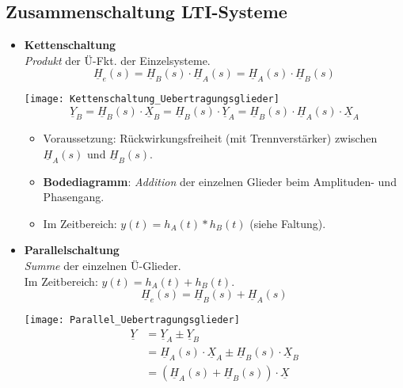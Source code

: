 \subsection{Zusammenschaltung LTI-Systeme}
\begin{itemize}
    \item \textbf{Kettenschaltung}\\
        \textit{Produkt} der Ü-Fkt. der Einzelsysteme.
        \[
            \boxed{\underline{H}_{e}(s)=\underline{H}_{B}(s) \cdot \underline{H}_{A}(s)=\underline{H}_{A}(s) \cdot \underline{H}_{B}(s)}
        \]
        \begin{center}
            \texttt{[image: Kettenschaltung\_Uebertragungsglieder]}
            \[
                \underline{Y}_{B}=\underline{H}_{B}(s) \cdot \underline{X}_{B}=\underline{H}_{B}(s) \cdot \underline{Y}_{A}=\underline{H}_{B}(s) \cdot \underline{H}_{A}(s) \cdot \underline{X}_{A}
            \]
        \end{center}
        \begin{itemize}
	        \item Voraussetzung: Rückwirkungsfreiheit (mit Trennverstärker) zwischen $\underline{H}_A(s)$ und $\underline{H}_B(s)$.
        	\item \textbf{Bodediagramm}: \textit{Addition} der einzelnen Glieder beim Amplituden- und Phasengang.
        	\item Im Zeitbereich: $y(t)=h_A(t) * h_B(t)$ (siehe Faltung).
        \end{itemize}      
    \item \textbf{Parallelschaltung}\\
        \textit{Summe} der einzelnen Ü-Glieder.\\
        Im Zeitbereich: $y(t)=h_A(t) + h_B(t)$.
        \[
            \boxed{\underline{H}_{e}(s)=\underline{H}_{B}(s) + \underline{H}_{A}(s)}
        \]
        \begin{center}
            \texttt{[image: Parallel\_Uebertragungsglieder]}
            \begin{align*}
                \underline{Y}&=\underline{Y}_{A} \pm \underline{Y}_{B}\\
                             &=\underline{H}_{A}(s) \cdot \underline{X}_{A} \pm \underline{H}_{B}(s) \cdot \underline{X}_{B}\\
                             &=\left(\underline{H}_{A}(s)+\underline{H}_{B}(s)\right) \cdot \underline{X}
            \end{align*}

\end{center}
\end{itemize}
